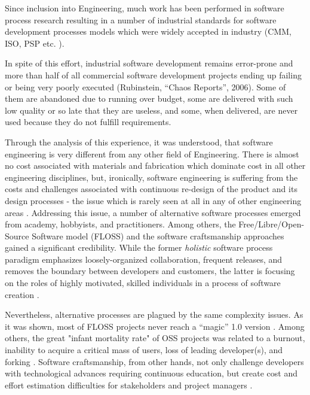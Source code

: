 Since inclusion into Engineering, much work has been performed in software process research 
resulting in a number of industrial standards for software development processes models which were 
widely accepted in industry (CMM, ISO, PSP etc. \cite{citeulike:5043104}). 

In spite of this effort, industrial software development remains error-prone and
more than half of all commercial software
development projects ending up failing or being very poorly executed (Rubinstein, ``Chaos Reports'', 2006). 
Some of them are abandoned due to running over budget, some are delivered with such low quality or so late that
they are useless, and some, when delivered, are never used because they do not fulfill requirements. 

Through the analysis of this experience, it was understood, that software engineering is
very different from any other field of Engineering. There is almost no cost associated with materials 
and fabrication which dominate cost in all other engineering disciplines, but, ironically, 
software engineering is suffering from the costs and challenges associated with continuous 
re-design of the product and its design processes - the issue which is rarely seen at all 
in any of other engineering areas \cite{citeulike:5203446}. Addressing this issue, a number of 
alternative software processes emerged from academy, hobbyists, and practitioners. 
Among others, the Free/Libre/Open-Source Software model (FLOSS) and the software craftsmanship  
approaches gained a significant credibility. While the former \textit{holistic} software process paradigm emphasizes
loosely-organized collaboration, frequent releases, and removes the boundary between developers and customers, 
the latter is focusing on the roles of highly motivated, skilled individuals in a process of software creation
\cite{citeulike:262020} \cite{citeulike:2759198}. 

Nevertheless, alternative processes are plagued by the same complexity issues. 
As it was shown, most of FLOSS projects 
never reach a ``magic'' 1.0 version \cite{citeulike:12480029}. Among others, the great "infant mortality rate" of OSS
projects was related to a burnout, inability to acquire a critical mass of users, loss of leading developer(s), and
forking \cite{richter2007critique}. Software craftsmanship, from other hands, not only challenge developers
with technological advances requiring continuous education, but create cost and effort estimation difficulties for
stakeholders and project managers \cite{citeulike:11058784}.

